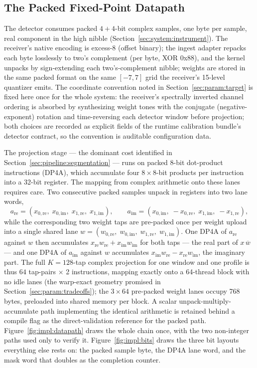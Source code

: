 \subsection{The Packed Fixed-Point Datapath}
\label{sec:impl:datapath}
The detector consumes packed $4{+}4$-bit complex samples, one byte per sample, real component in the high nibble (Section~\ref{sec:system:instrument}). The receiver's native encoding is excess-8 (offset binary); the ingest adapter repacks each byte losslessly to two's complement (per byte, XOR 0x88), and the kernel unpacks by sign-extending each two's-complement nibble; weights are stored in the same packed format on the same $[-7, 7]$ grid the receiver's 15-level quantizer emits. The coordinate convention noted in Section~\ref{sec:param:target} is fixed here once for the whole system: the receiver's spectrally inverted channel ordering is absorbed by synthesizing weight tones with the conjugate (negative-exponent) rotation and time-reversing each detector window before projection; both choices are recorded as explicit fields of the runtime calibration bundle's detector contract, so the convention is auditable configuration data.

The projection stage --- the dominant cost identified in Section~\ref{sec:pipeline:segmentation} --- runs on packed 8-bit dot-product instructions (DP4A), which accumulate four $8{\times}8$-bit products per instruction into a 32-bit register. The mapping from complex arithmetic onto these lanes requires care. Two consecutive packed samples unpack in registers into two lane words,
\[
a_{\mathrm{re}} = (x_{0,\mathrm{re}},\; x_{0,\mathrm{im}},\; x_{1,\mathrm{re}},\; x_{1,\mathrm{im}}), \qquad
a_{\mathrm{im}} = (x_{0,\mathrm{im}},\; -x_{0,\mathrm{re}},\; x_{1,\mathrm{im}},\; -x_{1,\mathrm{re}}),
\]
while the corresponding two weight taps are pre-packed once per weight upload into a single shared lane $w = (w_{0,\mathrm{re}},\; w_{0,\mathrm{im}},\; w_{1,\mathrm{re}},\; w_{1,\mathrm{im}})$. One DP4A of $a_{\mathrm{re}}$ against $w$ then accumulates $x_{\mathrm{re}}w_{\mathrm{re}} + x_{\mathrm{im}}w_{\mathrm{im}}$ for both taps --- the real part of $x\,\overline{w}$ --- and one DP4A of $a_{\mathrm{im}}$ against $w$ accumulates $x_{\mathrm{im}}w_{\mathrm{re}} - x_{\mathrm{re}}w_{\mathrm{im}}$, the imaginary part. The full $K = 128$-tap complex projection for one window and one profile is thus $64$ tap-pairs $\times$ 2 instructions, mapping exactly onto a 64-thread block with no idle lanes (the warp-exact geometry promised in Section~\ref{sec:param:tradeoffs}); the $3 \times 64$ pre-packed weight lanes occupy 768 bytes, preloaded into shared memory per block. A scalar unpack-multiply-accumulate path implementing the identical arithmetic is retained behind a compile flag as the direct-validation reference for the packed path. Figure~\ref{fig:impl:datapath} draws the whole chain once, with the two non-integer paths used only to verify it. Figure~\ref{fig:impl:bits} draws the three bit layouts everything else rests on: the packed sample byte, the DP4A lane word, and the mask word that doubles as the completion counter.

